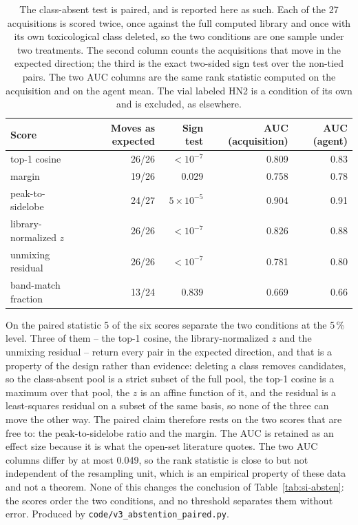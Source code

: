 \begin{table}[htbp]
\centering
\caption{The class-absent test is paired, and is reported here as such. Each of the 27 acquisitions is scored twice, once against the full computed library and once with its own toxicological class deleted, so the two conditions are one sample under two treatments. The second column counts the acquisitions that move in the expected direction; the third is the exact two-sided sign test over the non-tied pairs. The two AUC columns are the same rank statistic computed on the acquisition and on the agent mean. The vial labeled HN2 is a condition of its own and is excluded, as elsewhere.}
\label{tab:si-abstpaired}
\small
\begin{tabular}{lrrrr}
\toprule
Score & Moves as expected & Sign test & AUC (acquisition) & AUC (agent) \\
\midrule
top-1 cosine & 26/26 & $<10^{-7}$ & 0.809 & 0.83 \\
margin & 19/26 & 0.029 & 0.758 & 0.78 \\
peak-to-sidelobe & 24/27 & $5\times10^{-5}$ & 0.904 & 0.91 \\
library-normalized $z$ & 26/26 & $<10^{-7}$ & 0.826 & 0.88 \\
unmixing residual & 26/26 & $<10^{-7}$ & 0.781 & 0.80 \\
band-match fraction & 13/24 & 0.839 & 0.669 & 0.66 \\
\bottomrule
\end{tabular}

\begin{flushleft}\footnotesize On the paired statistic 5 of the six scores separate the two conditions at the 5\,\% level. Three of them -- the top-1 cosine, the library-normalized $z$ and the unmixing residual -- return every pair in the expected direction, and that is a property of the design rather than evidence: deleting a class removes candidates, so the class-absent pool is a strict subset of the full pool, the top-1 cosine is a maximum over that pool, the $z$ is an affine function of it, and the residual is a least-squares residual on a subset of the same basis, so none of the three can move the other way. The paired claim therefore rests on the two scores that are free to: the peak-to-sidelobe ratio and the margin. The AUC is retained as an effect size because it is what the open-set literature quotes. The two AUC columns differ by at most 0.049, so the rank statistic is close to but not independent of the resampling unit, which is an empirical property of these data and not a theorem. None of this changes the conclusion of Table~\ref{tab:si-absten}: the scores order the two conditions, and no threshold separates them without error. Produced by \texttt{code/v3\_abstention\_paired.py}.\end{flushleft}
\end{table}
